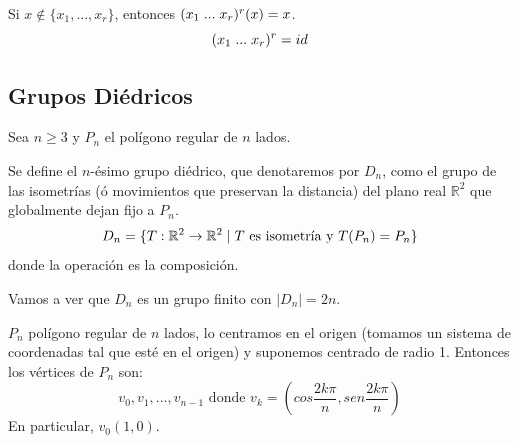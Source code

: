\documentclass[11pt,a4paper]{article}
\begin{document}
\begin{enumerate*}
Si $x \notin \{x_{1}, ..., x_{r}\}$, entonces $(x_{1} \hspace{0.1cm} ... \hspace{0.1cm} x_{r})^{r}(x) = x$.
$$(x_{1} \hspace{0.1cm} ... \hspace{0.1cm}  x_{r}) ^{r} = id$$
\end{enumerate*}

\subsection{Grupos Diédricos}

Sea $n \geq 3$ y $P_{n}$ el polígono regular de $n$ lados.

Se define el $n$-ésimo grupo diédrico, que denotaremos por $D_{n}$, como el grupo de las isometrías (ó movimientos que preservan la distancia) del plano real $\mathbb{R}^{2}$ que globalmente dejan fijo a $P_{n}$.
$$D_{n} = \{T: \mathbb{R}^{2} \to \mathbb{R}^{2} \hspace{0.1cm} | \hspace{0.1cm} T \text{ es isometría y } T(P_{n}) = P_{n}\}$$
donde la operación es la composición.

Vamos a ver que $D_{n}$ es un grupo finito con $|D_{n}| = 2n$.

$P_{n}$ polígono regular de $n$ lados, lo centramos en el origen (tomamos un sistema de coordenadas tal que esté en el origen) y suponemos centrado de radio 1. Entonces los vértices de $P_{n}$ son:
$$v_{0}, v_{1}, ..., v_{n-1} \text{ donde } v_{k} = (cos\frac{2k\pi}{n}, sen\frac{2k\pi}{n})$$
En particular, $v_{0}(1,0)$.
\end{document}
